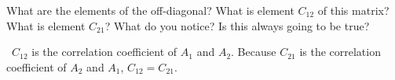 What are the elements of the off-diagonal? What is element $C_{12}$ of this matrix? What is element $C_{21}$? What do you notice? Is this always going to be true?

\begin{solution} \
$C_{12}$ is the correlation coefficient of $A_1$ and $A_2$. Because $C_{21}$ is the correlation coefficient of $A_2$ and $A_1$, $C_{12} = C_{21}$.
\end{solution}